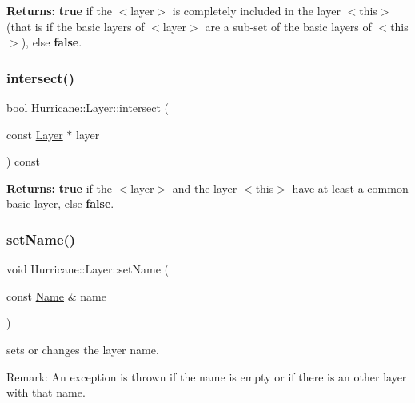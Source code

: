 {\bfseries Returns\+:} {\bfseries true} if the {\ttfamily $<$layer$>$} is completely included in the layer {\ttfamily $<$this$>$} (that is if the basic layers of {\ttfamily $<$layer$>$} are a sub-\/set of the basic layers of {\ttfamily $<$this$>$}), else {\bfseries false}. \mbox{\label{classHurricane_1_1Layer_adbea0bafaa87b033efdaa98bf2709182}} 
\subsubsection{\texorpdfstring{intersect()}{intersect()}}
{\footnotesize\ttfamily bool Hurricane\+::\+Layer\+::intersect (\begin{DoxyParamCaption}\item[{const \mbox{\hyperlink{classHurricane_1_1Layer}{Layer}} $\ast$}]{layer }\end{DoxyParamCaption}) const}

{\bfseries Returns\+:} {\bfseries true} if the {\ttfamily $<$layer$>$} and the layer {\ttfamily $<$this$>$} have at least a common basic layer, else {\bfseries false}. \mbox{\label{classHurricane_1_1Layer_ab93809f19bc360f58d35e91438ef2f87}} 
\subsubsection{\texorpdfstring{set\+Name()}{setName()}}
{\footnotesize\ttfamily void Hurricane\+::\+Layer\+::set\+Name (\begin{DoxyParamCaption}\item[{const \mbox{\hyperlink{classHurricane_1_1Name}{Name}} \&}]{name }\end{DoxyParamCaption})}

sets or changes the layer name.

\begin{DoxyParagraph}{Remark\+: An exception is thrown if the name is empty or if there is an }
other layer with that name. 
\end{DoxyParagraph}
\mbox{\label{classHurricane_1_1Layer_a400d17fe999c0080bb50489948986fe7}} 

